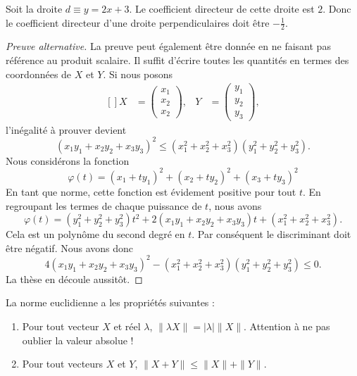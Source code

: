 \begin{example}
	Soit la droite $d\equiv y=2x+3$. Le coefficient directeur de cette droite est $2$. Donc le coefficient directeur d'une droite perpendiculaires doit être $-\frac{ 1 }{ 2 }$.
\end{example}

\begin{proof}[Preuve alternative]
	La preuve peut également être donnée en ne faisant pas référence au produit scalaire. Il suffit d'écrire toutes les quantités en termes des coordonnées de $X$ et $Y$. Si nous posons
	\begin{equation}
		\begin{aligned}[]
			X&=\begin{pmatrix}
				x_1	\\ 
				x_2	\\ 
				x_2	
			\end{pmatrix},
			&Y&=\begin{pmatrix}
				y_1	\\ 
				y_2	\\ 
				y_3	
			\end{pmatrix},
		\end{aligned}
	\end{equation}
	l'inégalité à prouver devient
	\begin{equation}
		(x_1y_1+x_2y_2+x_3y_3)^2\leq (x_1^2+x_2^2+x_3^2)(y_1^2+y_2^2+y_3^2).
	\end{equation}
	Nous considérons la fonction
	\begin{equation}
		\varphi(t)=(x_1+ty_1)^2+(x_2+ty_2)^2+(x_3+ty_3)^2
	\end{equation}
	En tant que norme, cette fonction est évidement positive pour tout $t$. En regroupant les termes de chaque puissance de $t$, nous avons
	\begin{equation}
		\varphi(t)=(y_1^2+y_2^2+y_3^2)t^2+2(x_1y_1+x_2y_2+x_3y_3)t+(x_1^2+x_2^2+x_3^2).
	\end{equation}
	Cela est un polynôme du second degré en $t$. Par conséquent le discriminant doit être négatif. Nous avons donc
	\begin{equation}
		4(x_1y_1+x_2y_2+x_3y_3)^2-(x_1^2+x_2^2+x_3^2)(y_1^2+y_2^2+y_3^2)\leq 0.
	\end{equation}
	La thèse en découle aussitôt.
\end{proof}

\begin{proposition}
	La norme euclidienne a les propriétés suivantes :
	\begin{enumerate}
		\item
			Pour tout vecteur $X$ et réel $\lambda$,  $\| \lambda X \|=| \lambda |\| X \|$. Attention à ne pas oublier la valeur absolue !
		\item
			Pour tout vecteurs $X$ et $Y$, $\| X+Y \|\leq \| X \|+\| Y \|$.
	\end{enumerate}
\end{proposition}

